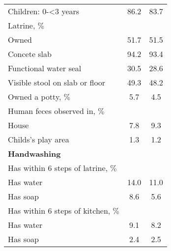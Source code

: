 \documentclass[11pt, nogin]{article}
\begin{document}
\begin{table}[!ht]
\begin{center}
\begin{small}
\begin{tabular}{@{\extracolsep{4pt}}l c c }
  \hspace{6mm}Children: 0-<3 years & 86.2 & 83.7 \\ 
  \hspace{3mm}Latrine, $\%$ &  &  \\ 
  \hspace{6mm}Owned & 51.7 & 51.5 \\ 
  \hspace{6mm}Concete slab & 94.2 & 93.4 \\ 
  \hspace{6mm}Functional water seal & 30.5 & 28.6 \\ 
  \hspace{6mm}Visible stool on slab or floor & 49.3 & 48.2 \\ 
  \hspace{3mm}Owned a potty, $\%$ & 5.7 & 4.5 \\ 
  \hspace{3mm}Human feces observed in, $\%$ &  &  \\ 
  \hspace{6mm}House & 7.8 & 9.3 \\ 
  \hspace{6mm}Childs's play area & 1.3 & 1.2 \\ 
  \textbf{Handwashing} &  &  \\ 
  \hspace{3mm}Has within 6 steps of latrine, $\%$ &  &  \\ 
  \hspace{6mm}Has water & 14.0 & 11.0 \\ 
  \hspace{6mm}Has soap & 8.6 & 5.6 \\ 
  \hspace{3mm}Has within 6 steps of kitchen, $\%$ &  &  \\ 
  \hspace{6mm}Has water & 9.1 & 8.2 \\ 
  \hspace{6mm}Has soap & 2.4 & 2.5 \\ \hline
\end{tabular}
\begin{scriptsize}
\begin{spacing}{1.0}

\end{spacing}
\end{scriptsize}
\end{small}
\end{center}
\end{table}

\FloatBarrier
\end{document}
